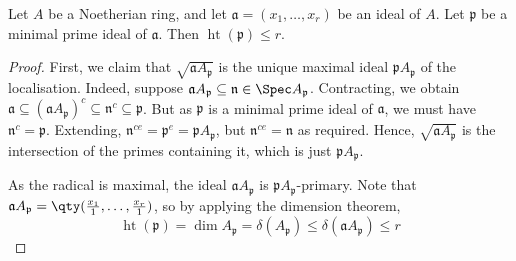 \begin{corollary}
    Let \( A \) be a Noetherian ring, and let \( \mathfrak a = (x_1, \dots, x_r) \) be an ideal of \( A \).
    Let \( \mathfrak p \) be a minimal prime ideal of \( \mathfrak a \).
    Then \( \operatorname{ht}(\mathfrak p) \leq r \).
\end{corollary}
\begin{proof}
    First, we claim that \( \sqrt{\mathfrak a A_{\mathfrak p}} \) is the unique maximal ideal \( \mathfrak p A_{\mathfrak p} \) of the localisation.
    Indeed, suppose \( \mathfrak a A_{\mathfrak p} \subseteq \mathfrak n \in \Spec A_{\mathfrak p} \).
    Contracting, we obtain \( \mathfrak a \subseteq (\mathfrak a A_{\mathfrak p})^c \subseteq \mathfrak n^c \subseteq \mathfrak p \).
    But as \( \mathfrak p \) is a minimal prime ideal of \( \mathfrak a \), we must have \( \mathfrak n^c = \mathfrak p \).
    Extending, \( \mathfrak n^{ce} = \mathfrak p^e = \mathfrak p A_{\mathfrak p} \), but \( \mathfrak n^{ce} = \mathfrak n \) as required.
    Hence, \( \sqrt{\mathfrak a A_{\mathfrak p}} \) is the intersection of the primes containing it, which is just \( \mathfrak p A_{\mathfrak p} \).

    As the radical is maximal, the ideal \( \mathfrak a A_{\mathfrak p} \) is \( \mathfrak p A_{\mathfrak p} \)-primary.
    Note that \( \mathfrak a A_{\mathfrak p} = \qty(\frac{x_1}{1}, \dots, \frac{x_r}{1}) \), so by applying the dimension theorem,
    \[ \operatorname{ht}(\mathfrak p) = \dim A_{\mathfrak p} = \delta(A_{\mathfrak p}) \leq \delta(\mathfrak a A_{\mathfrak p}) \leq r \]
\end{proof}
